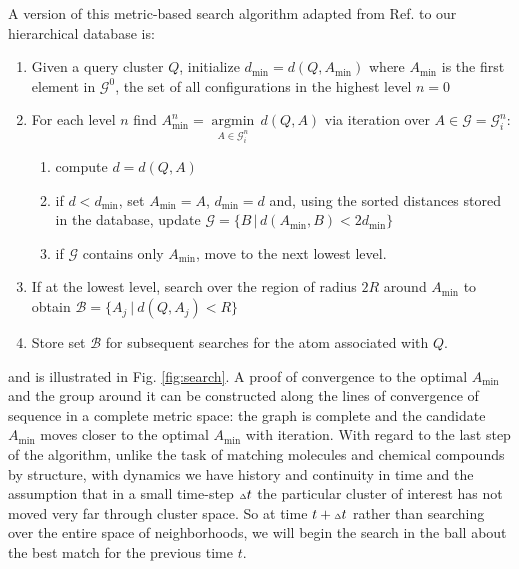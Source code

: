 \documentclass[journal=jctcce,manuscript=article]{achemso}
\newcommand{\cref}[1]{{Ref. \citenum{#1}}}
\newcommand{\fref}[1]{{Fig. \ref{#1}}}
\newcommand{\dt}{{\mathsmaller{\mathsmaller{\Delta}}}{t}}
\newcommand{\argmin}{\operatorname{argmin}}
\newcommand{\Bc}{\mathcal{B}}
\newcommand{\Gc}{\mathcal{G}}
\begin{document}
A version of this metric-based search algorithm adapted from \cref{Fogolari2012} to our hierarchical database is:
\begin{enumerate}[itemsep=-5pt]
\item Given a query cluster $Q$, initialize $d_\text{min} = d(Q,A_\text{min})$ where $A_\text{min}$ is the first element in $\mathcal{G}^0$, the set of all configurations in the highest level $n=0$ 
\item For each level $n$ find $A_\text{min}^n = \underset{A \in \mathcal{G}_i^n}{\argmin} \, d(Q,A)$ via iteration over $A \in \Gc = \Gc_i^n$:
\begin{enumerate}[itemsep=-5pt]
\item compute $d = d(Q,A)$
\item if $d < d_\text{min}$, set $A_\text{min} = A$, $d_\text{min} = d$ and, using the sorted distances stored in the database, update $\Gc = \{ B \, | \, d(A_\text{min},B) < 2 d_\text{min} \}$
\item if $\Gc$ contains only $A_\text{min}$, move to the next lowest level. 
\end{enumerate}
\item If at the lowest level, search over the region of radius $2 R$ around $A_\text{min}$ to obtain  $\Bc = \{ A_j \ | \ d(Q,A_j) < R\}$
\item Store set $\Bc$ for subsequent searches for the atom associated with $Q$.
\end{enumerate}
and is illustrated in \fref{fig:search}.
A proof of convergence to the optimal $A_\text{min}$ and the group around it can be constructed along the lines of convergence of sequence in a complete metric space: the graph is complete and the candidate $A_\text{min}$ moves closer to the optimal $A_\text{min}$ with iteration.
With regard to the last step of the algorithm, unlike the task of matching molecules and chemical compounds by structure, with dynamics we have history and continuity in time and the assumption that in a small time-step $\dt$ the particular cluster of interest has not moved very far through cluster space.
So at time $t+\dt $ rather than searching over the entire space of neighborhoods, we will begin the search in the ball about the best match for the previous time $t$. 
\end{document}
